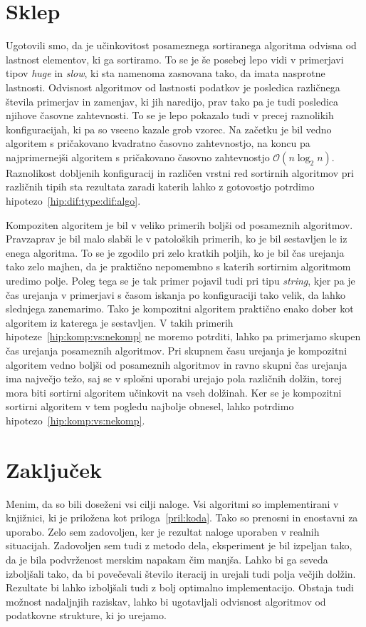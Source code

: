 \documentclass[a4paper,oneside,12pt]{article}
\begin{document}
\section{Sklep}
Ugotovili smo, da je učinkovitost posameznega sortiranega algoritma odvisna od
lastnost elementov, ki ga sortiramo. To se je še posebej lepo vidi v primerjavi
tipov \emph{huge} in \emph{slow}, ki sta namenoma zasnovana tako, da imata
nasprotne lastnosti. Odvisnost algoritmov od lastnosti podatkov je posledica
različnega števila primerjav in zamenjav, ki jih naredijo, prav tako pa je tudi
posledica njihove časovne zahtevnosti. To se je lepo pokazalo tudi v precej
raznolikih konfiguracijah, ki pa so vseeno kazale grob vzorec. Na začetku je bil
vedno algoritem s pričakovano kvadratno časovno zahtevnostjo, na koncu pa
najprimernejši algoritem s pričakovano časovno zahtevnostjo $\mathcal{O}(n\log_2
n)$. Raznolikost dobljenih konfiguracij in različen vrstni red sortirnih
algoritmov pri različnih tipih sta rezultata zaradi katerih lahko z gotovostjo
potrdimo hipotezo~\ref{hip:dif:type:dif:algo}.

Kompoziten algoritem je bil v veliko primerih boljši od posameznih
algoritmov. Pravzaprav je bil malo slabši le v patoloških primerih, ko je bil
sestavljen le iz enega algoritma. To se je zgodilo pri zelo kratkih poljih, ko
je bil čas urejanja tako zelo majhen, da je praktično nepomembno s katerih
sortirnim algoritmom uredimo polje. Poleg tega se je tak primer pojavil tudi pri
tipu \emph{string}, kjer pa je čas urejanja v primerjavi s časom iskanja po
konfiguraciji tako velik, da lahko slednjega zanemarimo. Tako je kompozitni
algoritem praktično enako dober kot algoritem iz katerega je sestavljen.
V takih primerih hipoteze~\ref{hip:komp:vs:nekomp} ne moremo potrditi, 
lahko pa primerjamo skupen čas urejanja posameznih algoritmov.
Pri skupnem času urejanja je kompozitni algoritem vedno boljši od
posameznih algoritmov in ravno skupni čas urejanja ima največjo težo, saj se v
splošni uporabi urejajo pola različnih dolžin, torej mora biti sortirni
algoritem učinkovit na vseh dolžinah. Ker se je kompozitni sortirni algoritem
v tem pogledu najbolje obnesel, lahko potrdimo hipotezo~\ref{hip:komp:vs:nekomp}.

\section{Zaključek}
Menim, da so bili doseženi vsi cilji naloge. Vsi algoritmi so implementirani v
knjižnici, ki je priložena kot priloga~\ref{pril:koda}. Tako so prenosni in
enostavni za uporabo. Zelo sem zadovoljen, ker je rezultat naloge uporaben v
realnih situacijah. Zadovoljen sem tudi z metodo dela, eksperiment je bil
izpeljan tako, da je bila podvrženost merskim napakam čim manjša. Lahko bi ga
seveda izboljšali tako, da bi povečevali število iteracij in urejali tudi polja
večjih dolžin. Rezultate bi lahko izboljšali tudi z bolj optimalno
implementacijo. Obstaja tudi možnost nadaljnjih raziskav, lahko bi ugotavljali 
odvisnost algoritmov od podatkovne strukture, ki jo urejamo.
\pagebreak
\end{document}
